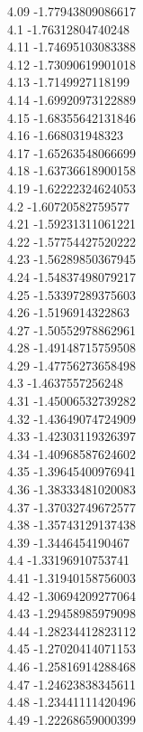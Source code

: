 {4.09	-1.77943809086617\\
4.1	-1.76312804740248\\
4.11	-1.74695103083388\\
4.12	-1.73090619901018\\
4.13	-1.7149927118199\\
4.14	-1.69920973122889\\
4.15	-1.68355642131846\\
4.16	-1.668031948323\\
4.17	-1.65263548066699\\
4.18	-1.63736618900158\\
4.19	-1.62222324624053\\
4.2	-1.60720582759577\\
4.21	-1.59231311061221\\
4.22	-1.57754427520222\\
4.23	-1.56289850367945\\
4.24	-1.54837498079217\\
4.25	-1.53397289375603\\
4.26	-1.5196914322863\\
4.27	-1.50552978862961\\
4.28	-1.49148715759508\\
4.29	-1.47756273658498\\
4.3	-1.4637557256248\\
4.31	-1.45006532739282\\
4.32	-1.43649074724909\\
4.33	-1.42303119326397\\
4.34	-1.40968587624602\\
4.35	-1.39645400976941\\
4.36	-1.38333481020083\\
4.37	-1.37032749672577\\
4.38	-1.35743129137438\\
4.39	-1.3446454190467\\
4.4	-1.33196910753741\\
4.41	-1.31940158756003\\
4.42	-1.30694209277064\\
4.43	-1.29458985979098\\
4.44	-1.28234412823112\\
4.45	-1.27020414071153\\
4.46	-1.25816914288468\\
4.47	-1.24623838345611\\
4.48	-1.23441111420496\\
4.49	-1.22268659000399\\
}
